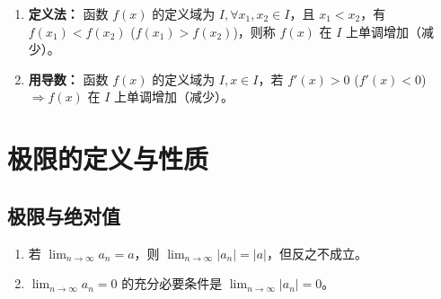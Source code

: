 \documentclass[a4paper,12pt]{ctexart}
\newenvironment{purplebox}
  {\begin{tcolorbox}[colback=white, colframe=boxpurple, boxrule=1pt, sharp corners, title=\textbf{定义/定理/核心公式}]}
  {\end{tcolorbox}}
\begin{document}
\begin{enumerate}
    \item \textbf{定义法：} 函数 $f(x)$ 的定义域为 $I, \forall x_1, x_2 \in I$，且 $x_1 < x_2$，有 $f(x_1) < f(x_2)$ ($f(x_1) > f(x_2)$)，则称 $f(x)$ 在 $I$ 上单调增加（减少）。
    \item \textbf{用导数：} 函数 $f(x)$ 的定义域为 $I, x \in I$，若 $f'(x) > 0$ ($f'(x) < 0$) $\Rightarrow f(x)$ 在 $I$ 上单调增加（减少）。
\end{enumerate}

\section{极限的定义与性质}

\subsection{极限与绝对值}
\begin{purplebox}
    \begin{enumerate}
        \item 若 $\lim_{n \to \infty} a_n = a$，则 $\lim_{n \to \infty} |a_n| = |a|$，但反之不成立。
        \item $\lim_{n \to \infty} a_n = 0$ 的充分必要条件是 $\lim_{n \to \infty} |a_n| = 0$。
    \end{enumerate}
\end{purplebox}
\end{document}
